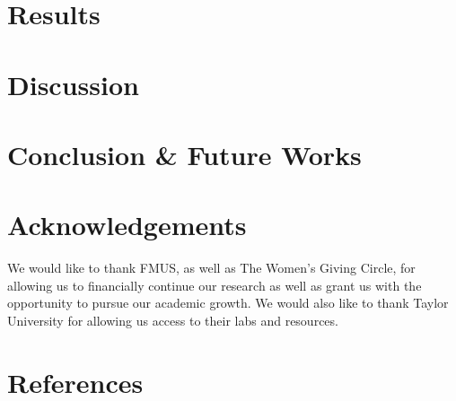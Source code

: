 \documentclass{article}
\begin{document}
%
%
\section{Results}


%
%
\section{Discussion}


%
%
\section{Conclusion \& Future Works}


%
%
\section{Acknowledgements}


We would like to thank FMUS, as well as The Women’s Giving Circle, for allowing us to financially continue our research as well as grant us with the opportunity to pursue our  academic growth. We would also like to thank Taylor University for allowing us access to their labs and resources. \cite{bbcCompression95} \par

%
%
\section{References}




\end{document}

